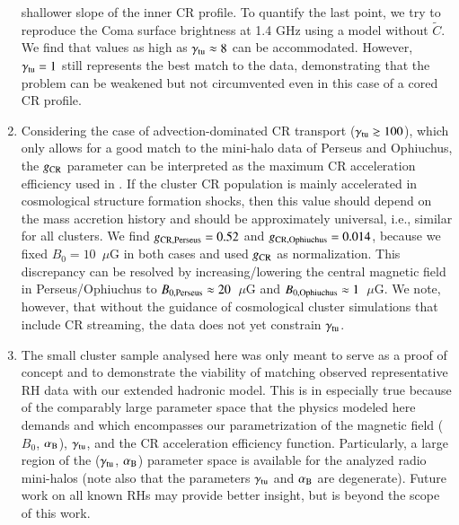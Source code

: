 \documentclass[useAMS,usenatbib]{mn2e}
\begin{document}
\begin{enumerate}
  shallower slope of the inner CR profile. To quantify the last point, we try to
  reproduce the Coma surface brightness at 1.4 GHz using a model without
  $\tilde{C}$. We find that values as high as $\gamma_{{\mathrm{tu}}} \approx 8$ can
  be accommodated. However, $\gamma_{{\mathrm{tu}}}=1$ still represents the best
  match to the data, demonstrating that the problem can be weakened but not
  circumvented even in this case of a cored CR profile. 
\item Considering the case of advection-dominated CR transport
  ($\gamma_{{\mathrm{tu}}}\gtrsim100$), which only allows for a good match to the
  mini-halo data of Perseus and Ophiuchus, the $g_{{\mathrm{CR}}}$ parameter can be
  interpreted as the maximum CR acceleration efficiency used in
  \cite{2010MNRAS.409..449P}. If the cluster CR population is mainly accelerated
  in cosmological structure formation shocks, then this value should depend on
  the mass accretion history and should be approximately universal, i.e.,
  similar for all clusters. We find $g_{{\mathrm{CR, Perseus}}} = 0.52$ and
  $g_{{\mathrm{CR, Ophiuchus}}} = 0.014$, because we fixed $B_{0}=10$~$\mu$G in both
  cases and used $g_{{\mathrm{CR}}}$ as normalization. This discrepancy can be
  resolved by increasing/lowering the central magnetic field in
  Perseus/Ophiuchus to $B_{0,{\mathrm{Perseus}}}\approx20$~$\mu$G and
  $B_{0,{\mathrm{Ophiuchus}}}\approx1$~$\mu$G. We note, however, that without the
  guidance of cosmological cluster simulations that include CR streaming, the
  data does not yet constrain $\gamma_{{\mathrm{tu}}}$.
\item The small cluster sample analysed here was only meant to serve as a proof
  of concept and to demonstrate the viability of matching observed
  representative RH data with our extended hadronic model. This is in especially
  true because of the comparably large parameter space that the physics modeled
  here demands and which encompasses our parametrization of the magnetic field
  ($B_0$, $ \alpha_{{\mathrm{B}}}$), $\gamma_{{\mathrm{tu}}}$, and the CR acceleration efficiency
  function. Particularly, a large region of the ($\gamma_{{\mathrm{tu}}}$,
  $\alpha_{{\mathrm{B}}}$) parameter space is available for the analyzed radio
  mini-halos (note also that the parameters $\gamma_{{\mathrm{tu}}}$ and
  $\alpha_{{\mathrm{B}}}$ are degenerate). Future work on all known RHs may provide
  better insight, but is beyond the scope of this work.
\end{enumerate}
\end{document}
